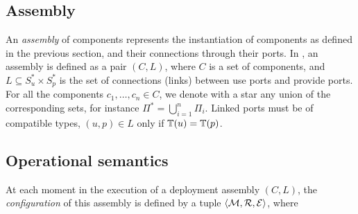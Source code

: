 {%
}

\subsection{Assembly}

An \emph{assembly} of components represents the instantiation of
components as defined in the previous section, and their connections
through their ports. In \mad, an assembly is defined as a pair $(C,
L)$, where $C$ is a set of components, and $L \subseteq S_u^*
\times S_p^*$ is the set of connections (links) between use ports and
provide ports. For all the components $c_1,\dots,c_n \in C$, we denote
with a star any union of the corresponding sets, for instance
$\Pi^*=\bigcup_{i=1}^{n}\Pi_{i}$. Linked ports must be of compatible
types, \ie $(u,p) \in L$ only if $\mathbb{T}(u) = \mathbb{T}(p)$.

\subsection{Operational semantics}
\label{subsec:operational_semantics}

At each moment in the execution of a \mad deployment assembly
$(C, L)$, the \emph{configuration} of this assembly is defined by a
tuple $\langle \mathcal{M}, \mathcal{R}, \mathcal{E} \rangle$, where

